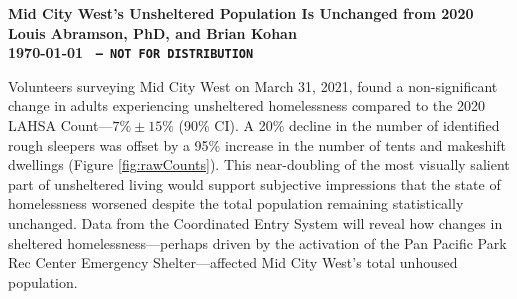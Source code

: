 \documentclass[11pt]{article}
\def\bfr{\bf\color{red}}
\begin{document}

\begin{center}
	\Large\bf Mid City West's Unsheltered Population Is Unchanged from 2020\\
	\vspace{1ex}
	{\normalsize\rm Louis Abramson, PhD, and Brian Kohan\\ \today 
	}{\bfr \texttt{ -- NOT FOR DISTRIBUTION}}
\end{center}

 Volunteers surveying Mid City West on March 31, 2021, found  
a non-significant change in adults experiencing unsheltered homelessness compared to the 2020 
LAHSA Count---$7\%\pm15\%$ (90\% CI). A 20\% decline in the number of identified rough 
sleepers was offset by a 95\% increase in the number of tents and makeshift dwellings 
(Figure \ref{fig:rawCounts}). This near-doubling of the most visually salient part of unsheltered 
living would support subjective impressions that the state of homelessness worsened despite the 
total population remaining statistically unchanged. Data from the Coordinated Entry System will 
reveal how changes in sheltered homelessness---perhaps driven by the activation of the Pan Pacific 
Park Rec Center Emergency Shelter---affected Mid City West's total unhoused population.

\begin{table}[h]
\caption{Mid City West 2021 Unsheltered Counts and Population Estimates}
\caption*{*Neither the change in raw counts or inferred population is statistically significant (parentheses 
denote 90\% uncertainties). No transition age youth, minors, or families were sighted.}
\label{tbl:summary}
\end{table}
\end{document}
